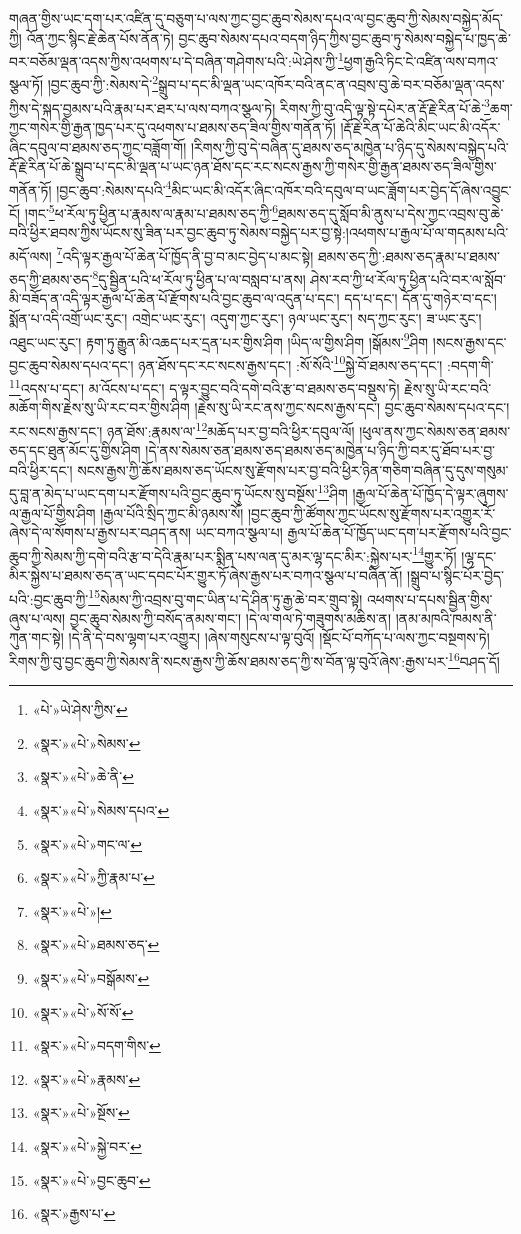 གཞན་གྱིས་ཡང་དག་པར་འཛིན་དུ་བཅུག་པ་ལས་ཀྱང་བྱང་ཆུབ་སེམས་དཔའ་ལ་བྱང་ཆུབ་ཀྱི་སེམས་བསྐྱེད་མོད་ཀྱི། འོན་ཀྱང་སྙིང་རྗེ་ཆེན་པོས་ནོན་ཏེ། བྱང་ཆུབ་སེམས་དཔའ་བདག་ཉིད་ཀྱིས་བྱང་ཆུབ་ཏུ་སེམས་བསྐྱེད་པ་ཁྱད་ཆེ་བར་བཅོམ་ལྡན་འདས་ཀྱིས་འཕགས་པ་དེ་བཞིན་གཤེགས་པའི་:ཡེ་ཤེས་ཀྱི་\footnote{«པེ་»ཡེ་ཤེས་ཀྱིས་}ཕྱག་རྒྱའི་ཏིང་ངེ་འཛིན་ལས་བཀའ་སྩལ་ཏོ། །བྱང་ཆུབ་ཀྱི་:སེམས་དེ་\footnote{«སྣར་»«པེ་»སེམས་}སྒྲུབ་པ་དང་མི་ལྡན་ཡང་འཁོར་བའི་ནང་ན་འབྲས་བུ་ཆེ་བར་བཅོམ་ལྡན་འདས་ཀྱིས་དེ་སྐད་བྱམས་པའི་རྣམ་པར་ཐར་པ་ལས་བཀའ་སྩལ་ཏེ། རིགས་ཀྱི་བུ་འདི་ལྟ་སྟེ་དཔེར་ན་རྡོ་རྗེ་རིན་པོ་ཆེ་\footnote{«སྣར་»«པེ་»ཆེ་ནི་}ཆག་ཀྱང་གསེར་གྱི་རྒྱན་ཁྱད་པར་དུ་འཕགས་པ་ཐམས་ཅད་ཟིལ་གྱིས་གནོན་ཏོ། །རྡོ་རྗེ་རིན་པོ་ཆེའི་མིང་ཡང་མི་འདོར་ཞིང་དབུལ་བ་ཐམས་ཅད་ཀྱང་བཟློག་གོ། །རིགས་ཀྱི་བུ་དེ་བཞིན་དུ་ཐམས་ཅད་མཁྱེན་པ་ཉིད་དུ་སེམས་བསྐྱེད་པའི་རྡོ་རྗེ་རིན་པོ་ཆེ་སྒྲུབ་པ་དང་མི་ལྡན་པ་ཡང་ཉན་ཐོས་དང་རང་སངས་རྒྱས་ཀྱི་གསེར་གྱི་རྒྱན་ཐམས་ཅད་ཟིལ་གྱིས་གནོན་ཏོ། །བྱང་ཆུབ་:སེམས་དཔའི་\footnote{«སྣར་»«པེ་»སེམས་དཔའ་}མིང་ཡང་མི་འདོར་ཞིང་འཁོར་བའི་དབུལ་བ་ཡང་ཟློག་པར་བྱེད་དོ་ཞེས་འབྱུང་ངོ། །གང་\footnote{«སྣར་»«པེ་»གང་ལ་}ཕ་རོལ་ཏུ་ཕྱིན་པ་རྣམས་ལ་རྣམ་པ་ཐམས་ཅད་ཀྱི་\footnote{«སྣར་»«པེ་»ཀྱི་རྣམ་པ་}ཐམས་ཅད་དུ་སློབ་མི་ནུས་པ་དེས་ཀྱང་འབྲས་བུ་ཆེ་བའི་ཕྱིར་ཐབས་ཀྱིས་ཡོངས་སུ་ཟིན་པར་བྱང་ཆུབ་ཏུ་སེམས་བསྐྱེད་པར་བྱ་སྟེ:།འཕགས་པ་རྒྱལ་པོ་ལ་གདམས་པའི་མདོ་ལས། \footnote{«སྣར་»«པེ་»། }འདི་ལྟར་རྒྱལ་པོ་ཆེན་པོ་ཁྱོད་ནི་བྱ་བ་མང་བྱེད་པ་མང་སྟེ། ཐམས་ཅད་ཀྱི་:ཐམས་ཅད་རྣམ་པ་ཐམས་ཅད་ཀྱི་ཐམས་ཅད་\footnote{«སྣར་»«པེ་»ཐམས་ཅད་}དུ་སྦྱིན་པའི་ཕ་རོལ་ཏུ་ཕྱིན་པ་ལ་བསླབ་པ་ནས། ཤེས་རབ་ཀྱི་ཕ་རོལ་ཏུ་ཕྱིན་པའི་བར་ལ་སློབ་མི་བཟོད་ན་འདི་ལྟར་རྒྱལ་པོ་ཆེན་པོ་རྫོགས་པའི་བྱང་ཆུབ་ལ་འདུན་པ་དང་། དད་པ་དང་། དོན་དུ་གཉེར་བ་དང་། སྨོན་པ་འདི་འགྲོ་ཡང་རུང་། འགྲེང་ཡང་རུང་། འདུག་ཀྱང་རུང་། ཉལ་ཡང་རུང་། སད་ཀྱང་རུང་། ཟ་ཡང་རུང་། འཐུང་ཡང་རུང་། རྟག་ཏུ་རྒྱུན་མི་འཆད་པར་དྲན་པར་གྱིས་ཤིག །ཡིད་ལ་གྱིས་ཤིག །སྒོམས་\footnote{«སྣར་»«པེ་»བསྒོམས་}ཤིག །སངས་རྒྱས་དང་བྱང་ཆུབ་སེམས་དཔའ་དང་། ཉན་ཐོས་དང་རང་སངས་རྒྱས་དང་། :སོ་སོའི་\footnote{«སྣར་»«པེ་»སོ་སོ་}སྐྱེ་བོ་ཐམས་ཅད་དང་། :བདག་གི་\footnote{«སྣར་»«པེ་»བདག་གིས་}འདས་པ་དང་། མ་འོངས་པ་དང་། ད་ལྟར་བྱུང་བའི་དགེ་བའི་རྩ་བ་ཐམས་ཅད་བསྡུས་ཏེ། རྗེས་སུ་ཡི་རང་བའི་མཆོག་གིས་རྗེས་སུ་ཡི་རང་བར་གྱིས་ཤིག །རྗེས་སུ་ཡི་རང་ནས་ཀྱང་སངས་རྒྱས་དང་། བྱང་ཆུབ་སེམས་དཔའ་དང་། རང་སངས་རྒྱས་དང་། ཉན་ཐོས་:རྣམས་ལ་\footnote{«སྣར་»«པེ་»རྣམས་}མཆོད་པར་བྱ་བའི་ཕྱིར་དབུལ་ལོ། །ཕུལ་ནས་ཀྱང་སེམས་ཅན་ཐམས་ཅད་དང་ཐུན་མོང་དུ་གྱིས་ཤིག །དེ་ནས་སེམས་ཅན་ཐམས་ཅད་ཐམས་ཅད་མཁྱེན་པ་ཉིད་ཀྱི་བར་དུ་ཐོབ་པར་བྱ་བའི་ཕྱིར་དང་། སངས་རྒྱས་ཀྱི་ཆོས་ཐམས་ཅད་ཡོངས་སུ་རྫོགས་པར་བྱ་བའི་ཕྱིར་ཉིན་གཅིག་བཞིན་དུ་དུས་གསུམ་དུ་བླ་ན་མེད་པ་ཡང་དག་པར་རྫོགས་པའི་བྱང་ཆུབ་ཏུ་ཡོངས་སུ་བསྔོས་\footnote{«སྣར་»«པེ་»སྔོས་}ཤིག །རྒྱལ་པོ་ཆེན་པོ་ཁྱོད་དེ་ལྟར་ཞུགས་ལ་རྒྱལ་པོ་གྱིས་ཤིག །རྒྱལ་པོའི་སྲིད་ཀྱང་མི་ཉམས་སོ། །བྱང་ཆུབ་ཀྱི་ཚོགས་ཀྱང་ཡོངས་སུ་རྫོགས་པར་འགྱུར་རོ་ཞེས་དེ་ལ་སོགས་པ་རྒྱས་པར་བཤད་ནས། ཡང་བཀའ་སྩལ་པ། རྒྱལ་པོ་ཆེན་པོ་ཁྱོད་ཡང་དག་པར་རྫོགས་པའི་བྱང་ཆུབ་ཀྱི་སེམས་ཀྱི་དགེ་བའི་རྩ་བ་དེའི་རྣམ་པར་སྨིན་པས་ལན་དུ་མར་ལྷ་དང་མིར་:སྐྱེས་པར་\footnote{«སྣར་»«པེ་»སྐྱེ་བར་}གྱུར་ཏོ། །ལྷ་དང་མིར་སྐྱེས་པ་ཐམས་ཅད་ན་ཡང་དབང་པོར་གྱུར་ཏོ་ཞེས་རྒྱས་པར་བཀའ་སྩལ་པ་བཞིན་ནོ། །སྒྲུབ་པ་སྙིང་པོར་བྱེད་པའི་:བྱང་ཆུབ་ཀྱི་\footnote{«སྣར་»«པེ་»བྱང་ཆུབ་}སེམས་ཀྱི་འབྲས་བུ་གང་ཡིན་པ་དེ་ཤིན་ཏུ་རྒྱ་ཆེ་བར་གྲུབ་སྟེ། འཕགས་པ་དཔས་སྦྱིན་གྱིས་ཞུས་པ་ལས། བྱང་ཆུབ་སེམས་ཀྱི་བསོད་ནམས་གང་། །དེ་ལ་གལ་ཏེ་གཟུགས་མཆིས་ན། །ནམ་མཁའི་ཁམས་ནི་ཀུན་གང་སྟེ། །དེ་ནི་དེ་བས་ལྷག་པར་འགྱུར། །ཞེས་གསུངས་པ་ལྟ་བུའོ། །སྡོང་པོ་བཀོད་པ་ལས་ཀྱང་བསྔགས་ཏེ། རིགས་ཀྱི་བུ་བྱང་ཆུབ་ཀྱི་སེམས་ནི་སངས་རྒྱས་ཀྱི་ཆོས་ཐམས་ཅད་ཀྱི་ས་བོན་ལྟ་བུའོ་ཞེས་:རྒྱས་པར་\footnote{«སྣར་»རྒྱས་པ་}བཤད་དོ། 